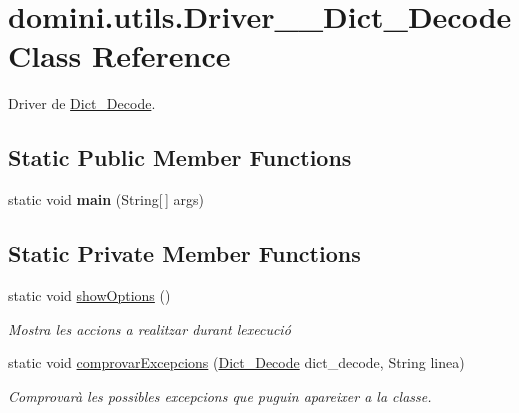 \hypertarget{classdomini_1_1utils_1_1Driver____Dict__Decode}{}\section{domini.\+utils.\+Driver\+\_\+\+\_\+\+Dict\+\_\+\+Decode Class Reference}
\label{classdomini_1_1utils_1_1Driver____Dict__Decode}


Driver de \hyperlink{classdomini_1_1utils_1_1Dict__Decode}{Dict\+\_\+\+Decode}.  


\subsection*{Static Public Member Functions}
\begin{DoxyCompactItemize}
\item 
\mbox{\label{classdomini_1_1utils_1_1Driver____Dict__Decode_a5045c12e35617afd929dfeb30930d541}} 
static void {\bfseries main} (String\mbox{[}$\,$\mbox{]} args)
\end{DoxyCompactItemize}
\subsection*{Static Private Member Functions}
\begin{DoxyCompactItemize}
\item 
\mbox{\label{classdomini_1_1utils_1_1Driver____Dict__Decode_af3ae63bfc55ea99e468d6c9c86ec26c9}} 
static void \hyperlink{classdomini_1_1utils_1_1Driver____Dict__Decode_af3ae63bfc55ea99e468d6c9c86ec26c9}{show\+Options} ()
\begin{DoxyCompactList}\small\item\em Mostra les accions a realitzar durant l\textquotesingle{}execució \end{DoxyCompactList}\item 
static void \hyperlink{classdomini_1_1utils_1_1Driver____Dict__Decode_a41ddfd0f1473de9401aa7860cff2f3e8}{comprovar\+Excepcions} (\hyperlink{classdomini_1_1utils_1_1Dict__Decode}{Dict\+\_\+\+Decode} dict\+\_\+decode, String linea)
\begin{DoxyCompactList}\small\item\em Comprovarà les possibles excepcions que puguin apareixer a la classe. \end{DoxyCompactList}\end{DoxyCompactItemize}


